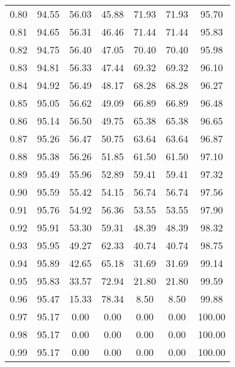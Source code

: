 \begin{tabular}{|c|c|c|c|c|c|c|}
      0.80 &     94.55 &     56.03 &      45.88 &   71.93 &      71.93 &         95.70 \\
      0.81 &     94.65 &     56.31 &      46.46 &   71.44 &      71.44 &         95.83 \\
      0.82 &     94.75 &     56.40 &      47.05 &   70.40 &      70.40 &         95.98 \\
      0.83 &     94.81 &     56.33 &      47.44 &   69.32 &      69.32 &         96.10 \\
      0.84 &     94.92 &     56.49 &      48.17 &   68.28 &      68.28 &         96.27 \\
      0.85 &     95.05 &     56.62 &      49.09 &   66.89 &      66.89 &         96.48 \\
      0.86 &     95.14 &     56.50 &      49.75 &   65.38 &      65.38 &         96.65 \\
      0.87 &     95.26 &     56.47 &      50.75 &   63.64 &      63.64 &         96.87 \\
      0.88 &     95.38 &     56.26 &      51.85 &   61.50 &      61.50 &         97.10 \\
      0.89 &     95.49 &     55.96 &      52.89 &   59.41 &      59.41 &         97.32 \\
      0.90 &     95.59 &     55.42 &      54.15 &   56.74 &      56.74 &         97.56 \\
      0.91 &     95.76 &     54.92 &      56.36 &   53.55 &      53.55 &         97.90 \\
      0.92 &     95.91 &     53.30 &      59.31 &   48.39 &      48.39 &         98.32 \\
      0.93 &     95.95 &     49.27 &      62.33 &   40.74 &      40.74 &         98.75 \\
      0.94 &     95.89 &     42.65 &      65.18 &   31.69 &      31.69 &         99.14 \\
      0.95 &     95.83 &     33.57 &      72.94 &   21.80 &      21.80 &         99.59 \\
      0.96 &     95.47 &     15.33 &      78.34 &    8.50 &       8.50 &         99.88 \\
      0.97 &     95.17 &      0.00 &       0.00 &    0.00 &       0.00 &        100.00 \\
      0.98 &     95.17 &      0.00 &       0.00 &    0.00 &       0.00 &        100.00 \\
      0.99 &     95.17 &      0.00 &       0.00 &    0.00 &       0.00 &        100.00 \\
\bottomrule
\end{tabular}
